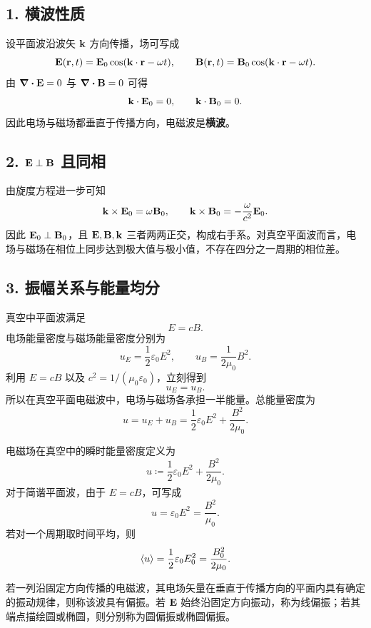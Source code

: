 \subsection*{1. 横波性质}

设平面波沿波矢 $\vb{k}$ 方向传播，场可写成
\[
\vb{E}(\vb{r},t)=\vb{E}_0\cos(\vb{k}\cdot\vb{r}-\omega t),
\qquad
\vb{B}(\vb{r},t)=\vb{B}_0\cos(\vb{k}\cdot\vb{r}-\omega t).
\]
由 $\div\vb{E}=0$ 与 $\div\vb{B}=0$ 可得
\[
\vb{k}\cdot\vb{E}_0=0,
\qquad
\vb{k}\cdot\vb{B}_0=0.
\]
因此电场与磁场都垂直于传播方向，电磁波是\textbf{横波}。

\subsection*{2. $\vb{E}\perp \vb{B}$ 且同相}

由旋度方程进一步可知
\[
\vb{k}\times \vb{E}_0=\omega \vb{B}_0,
\qquad
\vb{k}\times \vb{B}_0=-\frac{\omega}{c^2}\vb{E}_0.
\]
因此 $\vb{E}_0\perp \vb{B}_0$，且 $\vb{E},\vb{B},\vb{k}$ 三者两两正交，构成右手系。对真空平面波而言，电场与磁场在相位上同步达到极大值与极小值，不存在四分之一周期的相位差。

\subsection*{3. 振幅关系与能量均分}

真空中平面波满足
\[
E=cB.
\]
电场能量密度与磁场能量密度分别为
\[
u_E=\frac{1}{2}\varepsilon_0 E^2,
\qquad
u_B=\frac{1}{2\mu_0}B^2.
\]
利用 $E=cB$ 以及 $c^2=1/(\mu_0\varepsilon_0)$，立刻得到
\[
u_E=u_B.
\]
所以在真空平面电磁波中，电场与磁场各承担一半能量。总能量密度为
\[
u=u_E+u_B=\frac{1}{2}\varepsilon_0 E^2+\frac{B^2}{2\mu_0}.
\]

\begin{definition}[电磁波的能量密度]
电磁场在真空中的瞬时能量密度定义为
\[
 u\coloneqq \frac{1}{2}\varepsilon_0 E^2+\frac{B^2}{2\mu_0}.
\]
对于简谐平面波，由于 $E=cB$，可写成
\[
 u=\varepsilon_0 E^2=\frac{B^2}{\mu_0}.
\]
若对一个周期取时间平均，则
\[
 \langle u \rangle=\frac{1}{2}\varepsilon_0 E_0^2=\frac{B_0^2}{2\mu_0}.
\]
\end{definition}

\begin{definition}[偏振]
若一列沿固定方向传播的电磁波，其电场矢量在垂直于传播方向的平面内具有确定的振动规律，则称该波具有偏振。若 $\vb{E}$ 始终沿固定方向振动，称为线偏振；若其端点描绘圆或椭圆，则分别称为圆偏振或椭圆偏振。
\end{definition}


